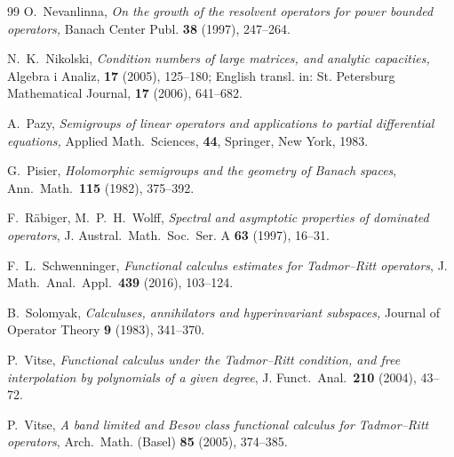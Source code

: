 \documentclass[11pt]{amsart}
\numberwithin{equation}{section}
\theoremstyle{definition}
\theoremstyle{plain}
\begin{document}
\begin{thebibliography}{99}
O.~Nevanlinna, \emph{On the growth of the resolvent operators for power bounded operators,}
Banach Center Publ. \textbf{38} (1997),  247--264.


 N.~K.~Nikolski, 
\emph{Condition numbers of large matrices, and analytic capacities,} Algebra i Analiz,
\textbf{17} (2005), 125--180; English transl. in:
St. Petersburg Mathematical Journal, \textbf{17} (2006), 641--682.

 A.~Pazy, \emph{Semigroups of linear operators and applications to partial differential equations,} Applied Math.\ Sciences, \textbf{44}, Springer, New York, 1983.

G.~Pisier,
\emph{Holomorphic semigroups and the geometry of Banach spaces},
Ann.\ Math.\ \textbf{115} (1982), 375--392.


F.~R\"abiger, M.~P.~H.~Wolff,
\emph{Spectral and asymptotic properties of dominated operators},
J. Austral.\ Math.\ Soc.\ Ser. A \textbf{63} (1997), 16--31.

F.~L.~Schwenninger,
\emph{Functional calculus estimates for Tadmor--Ritt operators},
J. Math.\ Anal.\ Appl.\ \textbf{439} (2016), 103--124.

 B.~Solomyak,
\emph{Calculuses, annihilators and hyperinvariant subspaces,}
Journal of Operator Theory  \textbf{9} (1983), 341--370. 

P.~Vitse,
\emph{Functional calculus under the Tadmor--Ritt condition, and free interpolation by polynomials of a given degree},
J. Funct.\ Anal.\ \textbf{210} (2004), 43--72.

P.~Vitse,
\emph{A band limited and Besov class functional calculus for Tadmor--Ritt operators},
Arch.\ Math. (Basel) \textbf{85} (2005), 374--385.

\end{thebibliography}
\end{document}
